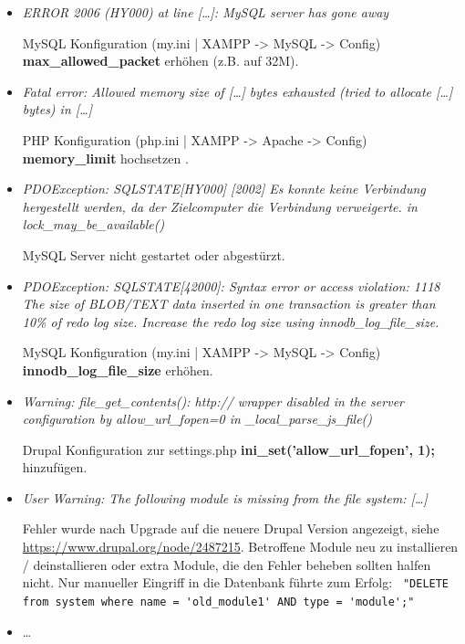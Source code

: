 \begin{itemize}[parsep=0pt, itemsep=5.0pt plus 2.0pt minus 1.0pt, leftmargin=*]
	\item \textit{ERROR 2006 (HY000) at line [\dots]: MySQL server has gone away}
	
	MySQL Konfiguration (my.ini | XAMPP -> MySQL -> Config)
	\textbf{max\_allowed\_packet} erhöhen (z.B. auf 32M).
	
	
	\item \textit{Fatal error: Allowed memory size of [\dots] bytes exhausted (tried to allocate [\dots] bytes) in [\dots]}
	
	PHP Konfiguration (php.ini | XAMPP -> Apache -> Config)
	\textbf{memory\_limit} hochsetzen .
	
	
	\item \textit{PDOException: SQLSTATE[HY000] [2002] Es konnte keine Verbindung hergestellt werden, da der Zielcomputer die Verbindung verweigerte. in lock\_may\_be\_available()}
	
	MySQL Server nicht gestartet oder abgestürzt.
	
	
	\item \textit{PDOException: SQLSTATE[42000]: Syntax error or access violation: 1118 The size of BLOB/TEXT data inserted in one transaction is greater than 10\% of redo log size. Increase the redo log size using innodb\_log\_file\_size.}
	
	MySQL Konfiguration (my.ini | XAMPP -> MySQL -> Config)
	\textbf{innodb\_log\_file\_size} erhöhen.
	
	
	\item \textit{Warning: file\_get\_contents(): http:// wrapper disabled in the server configuration by allow\_url\_fopen=0 in \_local\_parse\_js\_file()}
	
	Drupal Konfiguration zur settings.php \textbf{ini\_set('allow\_url\_fopen', 1);} hinzufügen.
	
	
	\item \textit{User Warning: The following module is missing from the file system: [\dots]}

	Fehler wurde nach Upgrade auf die neuere Drupal Version angezeigt, siehe \url{https://www.drupal.org/node/2487215}.
	Betroffene Module neu zu installieren / deinstallieren oder extra Module, die den Fehler beheben sollten halfen nicht. Nur manueller Eingriff in die Datenbank führte zum Erfolg: \lstinline| "DELETE from system where name = 'old_module1' AND type = 'module';"|
	
	\item \dots {}
\end{itemize}



